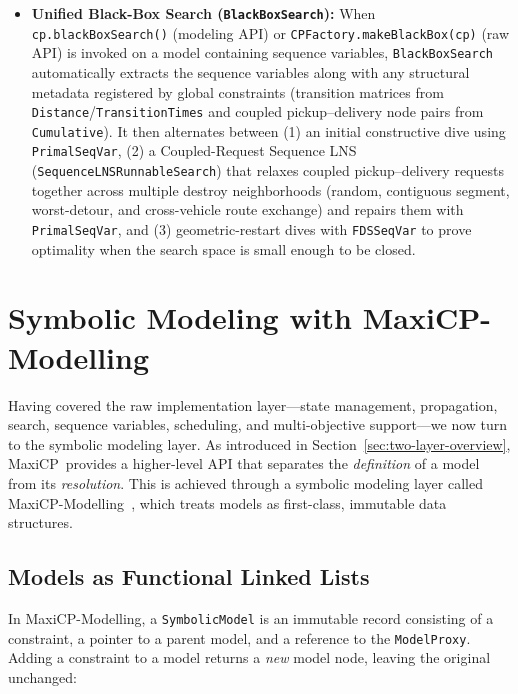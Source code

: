\documentclass[11pt, a4paper]{scrartcl}
\newcommand{\maxicp}{\textsf{MaxiCP}}
\begin{document}
\begin{itemize}
    \item \textbf{Unified Black-Box Search (\texttt{BlackBoxSearch}):}
    When \texttt{cp.blackBoxSearch()} (modeling API) or \texttt{CPFactory.makeBlackBox(cp)} (raw API) is invoked on a model containing sequence variables, \texttt{BlackBoxSearch} automatically extracts the sequence variables along with any structural metadata registered by global constraints (transition matrices from \texttt{Distance}/\texttt{TransitionTimes} and coupled pickup--delivery node pairs from \texttt{Cumulative}). It then alternates between (1) an initial constructive dive using \texttt{PrimalSeqVar}, (2) a Coupled-Request Sequence LNS (\texttt{SequenceLNSRunnableSearch}) that relaxes coupled pickup--delivery requests together across multiple destroy neighborhoods (random, contiguous segment, worst-detour, and cross-vehicle route exchange) and repairs them with \texttt{PrimalSeqVar}, and (3) geometric-restart dives with \texttt{FDSSeqVar} to prove optimality when the search space is small enough to be closed.
\end{itemize}


\section{Symbolic Modeling with \maxicp-Modelling}
\label{sec:symbolism}

Having covered the raw implementation layer---state management, propagation, search, sequence variables, scheduling, and multi-objective support---we now turn to the symbolic modeling layer.
As introduced in Section~\ref{sec:two-layer-overview}, \maxicp\ provides a higher-level API that separates the \emph{definition} of a model from its \emph{resolution}.
This is achieved through a symbolic modeling layer called \maxicp-Modelling~\cite{Derval2023Symbolism}, which treats models as first-class, immutable data structures.

\subsection{Models as Functional Linked Lists}

In \maxicp-Modelling, a \texttt{SymbolicModel} is an immutable record consisting of a constraint, a pointer to a parent model, and a reference to the \texttt{ModelProxy}. Adding a constraint to a model returns a \emph{new} model node, leaving the original unchanged:
\end{document}
